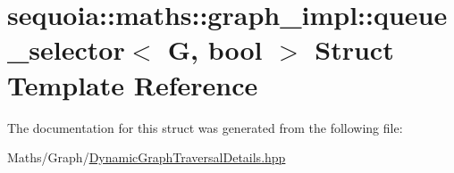 \hypertarget{structsequoia_1_1maths_1_1graph__impl_1_1queue__selector}{}\section{sequoia\+::maths\+::graph\+\_\+impl\+::queue\+\_\+selector$<$ G, bool $>$ Struct Template Reference}
\label{structsequoia_1_1maths_1_1graph__impl_1_1queue__selector}


The documentation for this struct was generated from the following file\+:\begin{DoxyCompactItemize}
\item 
Maths/\+Graph/\mbox{\hyperlink{_dynamic_graph_traversal_details_8hpp}{Dynamic\+Graph\+Traversal\+Details.\+hpp}}\end{DoxyCompactItemize}
